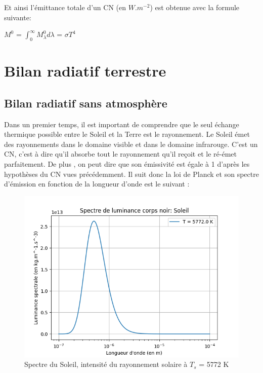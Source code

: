 \documentclass[a4paper, 12pt]{report} %
\newcommand{\figcaptionwithsource}[3]{\caption[#1 
            \newline #2]{#1} \addtocontents{lof}{\protect\vspace{1\baselineskip}}}
\begin{document}
\noindent Et ainsi l'émittance totale d'un CN (en $W.m^{-2}$) est obtenue avec la formule suivante: \vspace{\baselineskip}

\hfil $M^{0}$ = $\int_{0}^{\infty} M^{0}_\lambda d\lambda$ = $\sigma T^{4}$ 

 \section{Bilan radiatif terrestre}
\par

\subsection{Bilan radiatif sans atmosphère} 

Dans un premier temps, il est important de comprendre que le seul échange thermique possible entre le Soleil
et la Terre est le rayonnement. Le Soleil émet des rayonnements dans le domaine visible et dans le domaine infrarouge. C'est un CN, c'est à dire qu'il absorbe tout le rayonnement qu'il reçoit et le ré-émet 
parfaitement. De plus , on peut dire que son émissivité est 
égale à 1 d'après les hypothèses du CN vues précédemment. Il suit donc la loi de Planck et son spectre d'émission en fonction de 
la longueur d'onde est le suivant : 

\begin{figure}[h]
    \begin{center}
    \includegraphics[scale=0.7]{Images/Spectre de luminance corps noir Soleil.png}
    \figcaptionwithsource{Spectre du Soleil, intensité du rayonnement solaire à $T_s$ = 5772 K}{\textit{Python 3.12}}{fig:figure1}
    \end{center} 
\end{figure}
\end{document}
